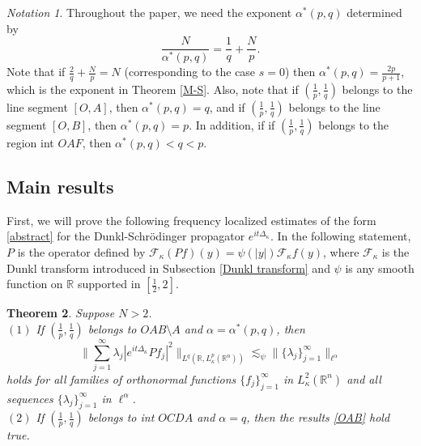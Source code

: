 \documentclass[a4paper,11pt, reqno]{amsart}
\numberwithin{equation}{section}
\theoremstyle{plain}
\newtheorem{theorem}{Theorem}[section]
\theoremstyle{definition}
\theoremstyle{remark}
\newtheorem{notation}[theorem]{Notation}
\begin{document}
\begin{notation}

Throughout the paper, we need the exponent $\alpha^*(p,q)$ determined by
\[
\frac{N}{\alpha^*(p,q)}=\frac{1}{q}+\frac{N}{p}.
\]
Note that if $\frac{2}{q} + \frac{N}{p} = N$ (corresponding to the case $s=0$) then $\alpha^*(p,q) = \frac{2p}{p+1}$, which is the exponent in Theorem \ref{M-S}. Also, note that if $(\frac{1}{p},\frac{1}{q})$ belongs to the line segment $[O,A]$, then $\alpha^*(p,q) = q$, and if $(\frac{1}{p},\frac{1}{q})$ belongs to the line segment $[O,B]$, then $\alpha^*(p,q) = p$. In addition, if if $(\frac{1}{p},\frac{1}{q})$ belongs to the region int $OAF$, then $\alpha^*(p,q)<q<p$.
\end{notation}
\subsection{Main results}First, we will prove the following frequency localized estimates of the form \eqref{abstract} for the Dunkl-Schr\"odinger propagator $e^{it\Delta_\kappa}$. In the following statement, $P$ is the operator defined by $\mathcal{F}_\kappa (Pf)(y)=\psi(|y|)\mathcal{F}_\kappa f(y)$, where $\mathcal{F}_\kappa$ is the Dunkl transform introduced in Subsection \ref{Dunkl transform} and $\psi$ is any smooth function on $\mathbb{R}$ supported in $[\frac{1}{2},2]$.
\begin{theorem} \label{frequency-localized} Suppose $N>2$.\\

$(1)$ If $(\frac{1}{p},\frac{1}{q})$ belongs to $ OAB\setminus A$  and $\alpha=\alpha^*(p,q)$, then
\begin{equation}\label{OAB}
			\bigg\|\sum_{j=1}^\infty \lambda_j|e^{it\Delta_\kappa}Pf_j|^2\bigg\|_{L^q(\mathbb{R}, L_\kappa^p(\mathbb{R}^n))}\lesssim_\psi \|\{\lambda_j\}^\infty_{j=1}\|_{\ell^{\alpha}} 
\end{equation}	
  holds for all families of orthonormal functions $\{f_j\}_{j=1}^\infty$ in $L_\kappa^2(\mathbb{R}^n)$ and all sequences $\{\lambda_j\}^\infty_{j=1}$ in $\ell^{\alpha}$. \\
  
$(2)$ If $(\frac{1}{p},\frac{1}{q})$ belongs to int $OCDA$ and $\alpha=q$, then the results \eqref{OAB} hold true.
\end{theorem}
\end{document}

